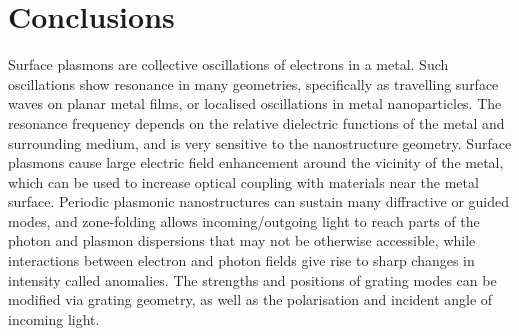 \section{Conclusions}
Surface plasmons are collective oscillations of electrons in a metal. Such oscillations show resonance in many geometries, specifically as travelling surface waves on planar metal films, or localised oscillations in metal nanoparticles. The resonance frequency depends on the relative dielectric functions of the metal and surrounding medium, and is very sensitive to the nanostructure geometry. Surface plasmons cause large electric field enhancement around the vicinity of the metal, which can be used to increase optical coupling with materials near the metal surface. Periodic plasmonic nanostructures can sustain many diffractive or guided modes, and zone-folding allows incoming/outgoing light to reach parts of the photon and plasmon dispersions that may not be otherwise accessible, while interactions between electron and photon fields give rise to sharp changes in intensity called anomalies. The strengths and positions of grating modes can be modified via grating geometry, as well as the polarisation and incident angle of incoming light.